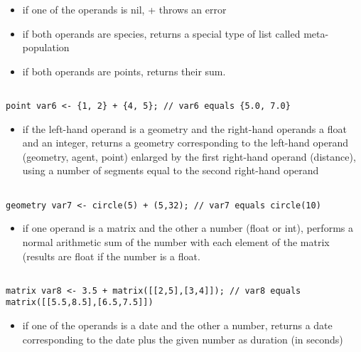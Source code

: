 \documentclass[]{book}
\providecommand{\tightlist}{%
  \setlength{\itemsep}{0pt}\setlength{\parskip}{0pt}}
\theoremstyle{definition}
\theoremstyle{definition}
\theoremstyle{definition}
\theoremstyle{remark}
\begin{document}
\begin{itemize}
\tightlist
\item
  if one of the operands is nil, + throws an error\\
\item
  if both operands are species, returns a special type of list called
  meta-population\\
\item
  if both operands are points, returns their sum.
\end{itemize}

\begin{verbatim}
 
point var6 <- {1, 2} + {4, 5}; // var6 equals {5.0, 7.0}
\end{verbatim}

\begin{itemize}
\tightlist
\item
  if the left-hand operand is a geometry and the right-hand operands a
  float and an integer, returns a geometry corresponding to the
  left-hand operand (geometry, agent, point) enlarged by the first
  right-hand operand (distance), using a number of segments equal to the
  second right-hand operand
\end{itemize}

\begin{verbatim}
 
geometry var7 <- circle(5) + (5,32); // var7 equals circle(10)
\end{verbatim}

\begin{itemize}
\tightlist
\item
  if one operand is a matrix and the other a number (float or int),
  performs a normal arithmetic sum of the number with each element of
  the matrix (results are float if the number is a float.
\end{itemize}

\begin{verbatim}
 
matrix var8 <- 3.5 + matrix([[2,5],[3,4]]); // var8 equals matrix([[5.5,8.5],[6.5,7.5]])
\end{verbatim}

\begin{itemize}
\tightlist
\item
  if one of the operands is a date and the other a number, returns a
  date corresponding to the date plus the given number as duration (in
  seconds)
\end{itemize}
\end{document}

